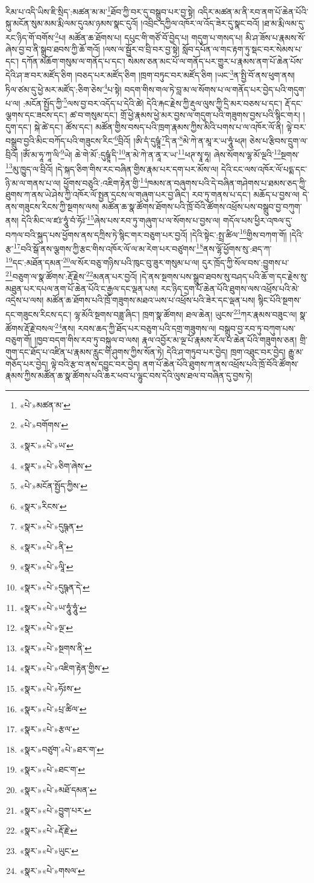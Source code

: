 རིམ་པ་འདི་ཡིས་ཇི་སྲིད་:མཚན་མ་མ་\footnote{«པེ་»མཚན་མ་}ཐོབ་ཀྱི་བར་དུ་བསྒྲུབ་པར་བྱ་སྟེ། འདིར་མཚན་མ་ནི་རབ་ནག་པོ་ཆེན་པོའི་སྐུ་མངོན་སུམ་མམ་རྨི་ལམ་དུའམ་ཉམས་སྣང་དུའོ། །འབྲིང་དཀྱིལ་འཁོར་ལ་འོད་ཟེར་དུ་སྣང་བའོ། །ཐ་མ་རྨི་ལམ་དུ་རང་ཉིད་གོ་བགོས་\footnote{«པེ་»བགོགས་}པ། མཚོན་ཆ་ཐོགས་པ། དཔུང་གི་གཙོ་བོ་བྱེད་པ། གདུག་པ་གསད་པ། མི་ཤ་ཟོས་པ་རྣམས་སོ་ཞེས་བྱ་བ་ནི་སྒྲུབ་ཐབས་ཀྱི་ཆོ་གའོ། །ལས་ལ་སྦྱོར་བ་བྲི་བར་བྱ་སྟེ། སློབ་དཔོན་ལ་གང་རྟག་ཏུ་སྡང་བར་སེམས་པ་དང་། དཀོན་མཆོག་གསུམ་ལ་གནོད་པ་དང་། སེམས་ཅན་མང་པོ་ལ་གནོད་པར་གྱུར་པ་རྣམས་ནག་པོ་ཆེན་པོས་དེའི་ཤ་ཟ་བར་མཛོད་ཅིག །བཅད་པར་མཛོད་ཅིག །ཁྲག་བཏུང་བར་མཛོད་ཅིག །ཡང་\footnote{«སྣར་»«པེ་»ཡ་}ན་སྤྱི་བོ་ནས་ཕུག་ནས། ཏིལ་ཙམ་དུ་ཕྱེ་མར་མཛོད་:ཅིག་ཅེས་\footnote{«སྣར་»«པེ་»ཅིག་ཞེས་}པ་སྟེ། བདག་གིས་གལ་ཏེ་བླ་མ་ལ་སོགས་པ་ལ་གནོད་པར་བྱེད་པའི་གདུག་པ་ལ། :མངོན་སྤྱོད་ཀྱི་\footnote{«པེ་»མངོན་སྤྱོད་ཀྱིས་}ལས་བྱ་བར་འདོད་པ་དེའི་ཚེ། དེའི་རྐང་རྗེས་ཀྱི་རྡུལ་ལུས་ཀྱི་དྲི་མར་བཅས་པ་དང་། རྡོ་དང་ལྕགས་དང་ཟངས་དང་། ཚ་བ་གསུམ་དང་། གྲོ་ཕྱེ་རྣམས་ཕྱེ་མར་བྱས་ལ་གདུག་པའི་གཟུགས་བྱས་པའི་སྙིང་གར། །དུག་དང་། སྐེ་ཚེ་དང་། ཚོས་དང་། མཚོན་གྱིས་བསད་པའི་ཁྲག་རྣམས་ཀྱིས་མིའི་པགས་པ་ལ་འཁོར་ལོ་ནི། ལྟེ་བར་བསྒྲུབ་བྱའི་མིང་བཀོད་པའི་གཟུངས་རིང་\footnote{«སྣར་»རིངས་}བྲིའོ། །ཨི་དཾ་དུཥྚཱཾ་\footnote{«སྣར་»«པེ་»དུཥྚན་}དི་ན་\footnote{«སྣར་»«པེ་»ནི་}མེ་ཀེ་ན་མཱ་ར་ཡ་ཧཱུཾ་ཕཊ། ཅེས་པ་རྩིབས་དྲུག་ལ་བྲིའོ། །ཨོཾ་མ་ཧཱ་ཀཱ་ལི་\footnote{«སྣར་»«པེ་»ལཱི་}ཡེ། ཆེ་གེ་མོ་:དུཥྚཱཾ་དི་\footnote{«སྣར་»«པེ་»དུཥྚན་དེ་}ན་མེ་ཀེ་ན་ནཱ་ར་ཡ་\footnote{«སྣར་»«པེ་»ཡ་ཧཱུཾ་ཧཱུཾ་}ཕཊ་སྭཱ་ཧཱ། ཞེས་སོགས་ལྷ་མོ་ལྔའི་\footnote{«སྣར་»«པེ་»ལྔ་}སྔགས་\footnote{«སྣར་»«པེ་»སྔགས་ནི་}མུ་ཁྱུད་ལ་བྲིའོ། །དེ་སྐད་ཅིག་གིས་རང་བཞིན་གྱིས་རྣམ་པར་དག་པར་མོས་ལ། དེའི་ངང་ལས་འཁོར་ལོ་པདྨ་དང་ཉི་མ་ལ་གནས་པ་ལ། ཕྱོགས་བཅུའི་:འཇིག་རྟེན་གྱི་\footnote{«སྣར་»«པེ་»འཇིག་རྟེན་གྱིས་}ཁམས་ན་བཞུགས་པའི་དེ་བཞིན་གཤེགས་པ་ཐམས་ཅད་ཀྱི་ཐུགས་ཀ་ནས་ཡེ་ཤེས་ཀྱི་འཁོར་ལོ་སྤྱན་དྲངས་ལ་གཞུག་པར་བྱ་ཞིང་། རབ་ཏུ་གནས་པ་དང་། མཆོད་པ་བྱས་ལ། དེ་ནས་གཟུངས་རིངས་ཀྱི་སྔགས་ལས། མཚོན་ཆ་སྣ་ཚོགས་ཐོགས་པའི་ཁྲོ་བོའི་ཚོགས་འཕྲོས་པས་བསྒྲུབ་བྱ་བཀུག་ནས། དེའི་མིང་ལ་ཛཿ་ཧཱུཾ་བཾ་ཧོཿ་\footnote{«སྣར་»«པེ་»ཧོཿས་}ཞེས་པས་རབ་ཏུ་གཞུག་པ་ལ་སོགས་པ་བྱས་ལ། གདོལ་པས་ཕྱིར་འཁལ་དུ་བཀལ་བའི་སྐུད་པས་ཕྱོགས་ནས་དཀྲིས་ཏེ་སྙིང་གར་བཅུག་པར་བྱའོ། །དེའི་སྟེང་:སྤྲ་ཚིལ་\footnote{«སྣར་»«པེ་»པྲ་ཚིལ་}གྱིས་བཀག་གོ། །དེའི་རྩ་\footnote{«སྣར་»«པེ་»རྩལ་}བའི་སྒོ་ནས་ལྕགས་ཀྱི་རྩང་གིས་འཁོར་ལོ་ལ་མ་རེག་པར་བཙུགས་\footnote{«སྣར་»བཙུག་«པེ་»ཐར་ག་}ནས་ལྷོ་ཕྱོགས་སུ་:ཐད་ཀ་\footnote{«སྣར་»«པེ་»ཐང་ག་}དང་:མཐོན་དམན་\footnote{«སྣར་»«པེ་»མཐོ་དམན་}ལ་སོར་བཅུ་གཉིས་པའི་ཁུང་བུ་ཟུར་གསུམ་པ་ལ། དུར་ཁྲོད་ཀྱི་སོལ་བས་:བྱུགས་པ་\footnote{«སྣར་»«པེ་»བྱུག་པར་}བཅུག་ལ་སྣ་ཚོགས་:རྡོ་རྗེས་\footnote{«སྣར་»«པེ་»རྡོ་རྗེ་}མནན་པར་བྱའོ། །དེ་ནས་སྔགས་པས་སྒྲུབ་ཐབས་སུ་བཤད་པའི་ཆོ་ག་དང་རྗེས་སུ་མཐུན་པར་དཔལ་ནག་པོ་ཆེན་པོའི་ང་རྒྱལ་དང་ལྡན་པས། རང་ཉིད་དྲག་པོ་ཆེན་པོའི་ཐུགས་ལས་འཕྲོས་པའི་མེ་འདྲེས་པ་ལས། མཚོན་ཆ་ཐོགས་པའི་ཁྲོ་གཟུགས་མཐའ་ཡས་པ་འཕྲོས་པའི་ཟེར་དང་ལྡན་པས། སྙིང་པོའི་སྔགས་དང་གཟུངས་རིངས་དང་། ལྷ་མོའི་སྔགས་བཟླ་ཞིང་། ཁྲག་སྣ་ཚོགས། ཐལ་ཆེན། ཡུངས་\footnote{«སྣར་»«པེ་»ཡུང་}ཀར་རྣམས་བཟུང་ལ། སྣ་ཚོགས་རྡོ་རྗེ་བསལ་\footnote{«སྣར་»«པེ་»གསལ་}ནས། རབས་ཆད་ཀྱི་ཐོད་པར་བཅུག་པའི་དགྲ་གཟུགས་ལ། བསྒྲུབ་བྱ་རབ་ཏུ་བཀུག་པས་བཅུག་གོ། །ཁྱབ་བདག་གིས་རབ་ཏུ་བསྐུལ་བ་ལས། རྣལ་འབྱོར་མ་ལྔ་པོ་རྣམས་རོལ་པ་ཆེན་པོའི་གཟུགས་ཅན། གྲི་གུག་དང་ཐོད་པ་འཛིན་པ་རྣམས་རླུང་གི་ཤུགས་ཀྱིས་སོན་ཏེ། དེའི་ཤ་གཏུབ་པར་བྱེད། ཁྲག་འཐུང་བར་བྱེད། རྒྱུ་མ་གཅོད་པར་བྱེད། ལྟེ་བའི་རྩ་བ་ནས་དབྱུང་བར་བྱེད། ནག་པོ་ཆེན་པོའི་ཐུགས་ཀ་ནས་འཕྲོས་པའི་ཁྲོ་བོའི་ཚོགས་རྣམས་ཀྱིས་མཚོན་ཆ་སྣ་ཚོགས་པའི་ཆར་ཕབ་པ་ལྷུང་བས་དེའི་ལུས་ཐལ་བ་བཞིན་དུ་བྱས་ཏེ། 